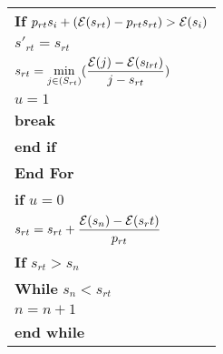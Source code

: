 \begin{table}
\begin{minipage}[b]{8cm}
\begin{tabular}{p{7cm}}
\hspace{7mm}\textbf{If} $p_{rt}s_i + (\mathcal{E}(s_{rt}) - p_{rt}s_{rt}) > \mathcal{E}(s_i)$
\\
\hspace{10mm}$s'_{rt} = s_{rt}$
\\
\hspace{10mm}$s_{rt} = \displaystyle \min_{j\in(S_{rt})}(\dfrac{\mathcal{E}(j)-\mathcal{E}(s_{lrt})}{j-s_{rt}})$
\\
\hspace{10mm}$u=1$
\\
\hspace{10mm}\textbf{break}
\\
\hspace{7mm}\textbf{end if}
\\
\hspace{4mm}\textbf{End For}
\\
\hspace{4mm}\textbf{if} $u=0$
\\
\hspace{7mm} $s_{rt} = s_{rt} + \dfrac{\mathcal{E}(s_n)-\mathcal{E}(s_rt)}{p_{rt}}$
\\
\hspace{7mm}\textbf{If} $s_{rt}>s_{n}$
\\
\hspace{10mm}\textbf{While} $s_n < s_{rt}$
\\
\hspace{13mm} $n=n+1$
\\
\hspace{10mm} \textbf{end while}
\\

\end{tabular}
\end{minipage}
\end{table}
